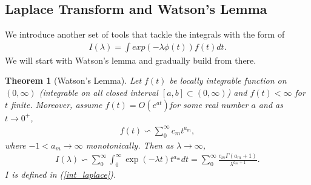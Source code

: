 \documentclass[10pt]{article}
\newtheorem{theorem}{\bf Theorem}
\newenvironment{Proof of lemma}{\noindent{\bf Proof of Lemma}}{\hfill$\Box$\newline}
\newenvironment{Proof of claim}{\noindent{\bf Proof of claim}}{\hfill$\Box$\newline}
\newenvironment{Proof of theorem}{\noindent{\bf Proof of Theorem}}{\hfill\scriptsize{$\Box$}\newline}
\newenvironment{Proof of theorems}{\noindent{\bf Proof of Theorems}}{\hfill$\Box$\newline}
\newenvironment{Proof of proposition}{\noindent{\bf Proof of Proposition}}{\hfill$\Box$\newline}
\newenvironment{Proof of propositions}{\noindent{\bf Proof of Propositions}}{\hfill$\Box$\newline}
\newenvironment{Proof of exercise}{\noindent{\it Proof of Exercise:}}{\hfill$\Box$}
\numberwithin{equation}{section}
\begin{document}
\subsection{Laplace Transform and Watson's Lemma}
We introduce another set of tools that tackle the integrals with the form of
\begin{align} \label{int_laplace}
    I(\lambda) = \int exp(-\lambda \phi(t))f(t)dt.
\end{align}
We will start with Watson's lemma and gradually build from there.
\begin{theorem}[Watson's Lemma]
    Let $f(t)$ be locally integrable function on $(0,\infty)$ (integrable on all closed interval $[a,b] \subset (0,\infty)$) and $f(t) < \infty$ for $t$ finite. Moreover, assume $f(t) = O(e^{at})$for some real number $a$ and as $t \to 0^+$,
    \begin{align}
        f(t) \backsim \sum_0^{\infty} c_m t^{a_m},
    \end{align}
    where $-1 < a_m \to \infty$ monotonically. Then as $\lambda \to \infty$,
    \begin{align}
        I(\lambda) \backsim \sum_0^{\infty} \int_0^{\infty} \exp(-\lambda t) t^{a_m} dt =  \sum_0^{\infty} \frac{c_m \Gamma(a_m+1)}{\lambda^{a_m+1}}.
    \end{align}
    $I$ is defined in (\ref{int_laplace}).
\end{theorem}
\end{document}
